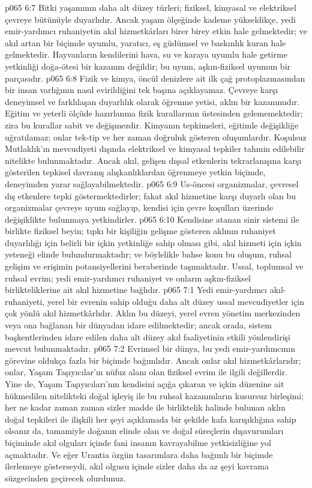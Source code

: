 \vs p065 6:7 Bitki yaşamının daha alt düzey türleri; fiziksel, kimyasal ve elektriksel çevreye bütünüyle duyarlıdır. Ancak yaşam ölçeğinde kademe yükseldikçe, yedi emir\hyp{}yardımcı ruhaniyetin akıl hizmetkârları birer birey etkin hale gelmektedir; ve akıl artan bir biçimde uyumlu, yaratıcı, eş güdümsel ve baskınlık kuran hale gelmektedir. Hayvanların kendilerini hava, su ve karaya uyumlu hale getirme yetkinliği doğa\hyp{}ötesi bir kazanım değildir; bu uyum, aşkın\hyp{}fiziksel uyumun bir parçasıdır.
\vs p065 6:8 Fizik ve kimya, öncül denizlere ait ilk çağ protoplazmasından bir insan varlığının nasıl evirildiğini tek başına açıklayamaz. Çevreye karşı deneyimsel ve farklılaşan duyarlılık olarak öğrenme yetisi, aklın bir kazanımıdır. Eğitim ve yeterli ölçüde hazırlanma fizik kurallarının üstesinden gelememektedir; zira bu kurallar sabit ve değişmezdir. Kimyanın tepkimeleri, eğitimle değişikliğe uğratılamaz; onlar tek\hyp{}tip ve her zaman doğruluk gösteren oluşumlardır. Koşulsuz Mutlaklık’ın mevcudiyeti dışında elektriksel ve kimyasal tepkiler tahmin edilebilir nitelikte bulunmaktadır. Ancak akıl, gelişen dışsal etkenlerin tekrarlanışına karşı gösterilen tepkisel davranış alışkanlıklardan öğrenmeye yetkin biçimde, deneyimden yarar sağlayabilmektedir.
\vs p065 6:9 Us\hyp{}öncesi organizmalar, çevresel dış etkenlere tepki göstermektedirler; fakat akıl hizmetine karşı duyarlı olan bu organizmalar çevreye uyum sağlayıp, kendisi için çevre koşulları üzerinde değişiklikte bulunmaya yetkindirler.
\vs p065 6:10 Kendisine atanan sinir sistemi ile birlikte fiziksel beyin; tıpkı bir kişiliğin gelişme gösteren aklının ruhaniyet duyarlılığı için belirli bir içkin yetkinliğe sahip olması gibi, akıl hizmeti için içkin yeteneği elinde bulundurmaktadır; ve böylelikle bahse konu bu oluşum, ruhsal gelişim ve erişimin potansiyellerini beraberinde taşımaktadır. Ussal, toplumsal ve ruhsal evrim; yedi emir\hyp{}yardımcı ruhaniyet ve onların aşkın\hyp{}fiziksel birlikteliklerine ait akıl hizmetine bağlıdır.
\vs p065 7:1 Yedi emir\hyp{}yardımcı akıl\hyp{}ruhaniyeti, yerel bir evrenin sahip olduğu daha alt düzey ussal mevcudiyetler için çok yönlü akıl hizmetkârlıdır. Aklın bu düzeyi, yerel evren yönetim merkezinden veya ona bağlanan bir dünyadan idare edilmektedir; ancak orada, sistem başkentlerinden idare edilen daha alt düzey akıl faaliyetinin etkili yönlendirişi mevcut bulunmaktadır.
\vs p065 7:2 Evrimsel bir dünya, bu yedi emir\hyp{}yardımcının görevine oldukça fazla bir biçimde bağımlıdır. Ancak onlar akıl hizmetkârlarıdır; onlar, Yaşam Taşıyıcılar’ın nüfuz alanı olan fiziksel evrim ile ilgili değillerdir. Yine de, Yaşam Taşıyıcıları’nın kendisini açığa çıkaran ve içkin düzenine ait hükmedilen nitelikteki doğal işleyiş ile bu ruhsal kazanımların kusursuz birleşimi; her ne kadar zaman zaman sizler madde ile birliktelik halinde bulunan aklın doğal tepkileri ile ilişkili her şeyi açıklamada bir şekilde kafa karışıklığına sahip olsanız da, tamamiyle doğanın elinde olan ve doğal süreçlerin dışavurumları biçiminde akıl olguları içinde fani insanın kavrayabilme yetkisizliğine yol açmaktadır. Ve eğer Urantia özgün tasarımlara daha bağımlı bir biçimde ilerlemeye gösterseydi, akıl olgusu içinde sizler daha da az şeyi kavrama süzgecinden geçirecek olurdunuz.
